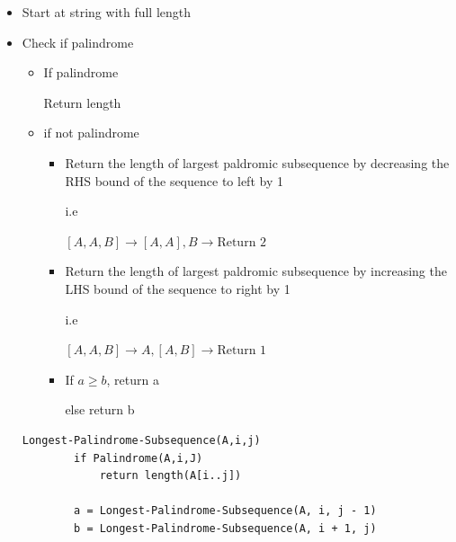 \documentclass[12pt]{article}
\begin{document}
\begin{enumerate}[1.]
    \begin{itemize}
        \item Start at string with full length
        \item Check if palindrome

        \begin{itemize}
            \item If palindrome

            \bigskip

            Return length
            \item if not palindrome

            \begin{itemize}
                \item Return the length of largest paldromic subsequence
                by decreasing the RHS bound of the sequence to left by 1

                \bigskip

                i.e

                \bigskip

                $[A,A,B] \to [A,A],B \to \text{Return 2}$

                \item Return the length of largest paldromic subsequence
                by increasing the LHS bound of the sequence to right by 1



                \bigskip

                i.e

                \bigskip

                $[A,A,B] \to A,[A,B] \to \text{Return 1}$

                \bigskip

                \item

                If $a \geq b$, return a

                \bigskip

                else return b
            \end{itemize}
        \end{itemize}

        \bigskip

    \begin{lstlisting}[mathescape=true]
    Longest-Palindrome-Subsequence(A,i,j)
        if Palindrome(A,i,J)
            return length(A[i..j])

        a = Longest-Palindrome-Subsequence(A, i, j - 1)
        b = Longest-Palindrome-Subsequence(A, i + 1, j)


\end{lstlisting}
\end{itemize}
\end{enumerate}
\end{document}
